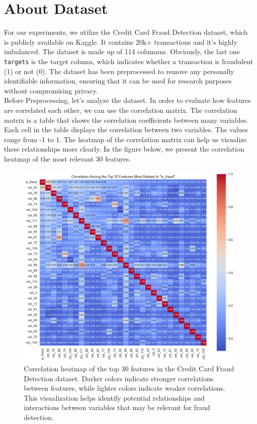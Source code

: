\documentclass[10pt]{article}
\begin{document}
\section{About Dataset}
For our experiments, we utilize the Credit Card Fraud Detection dataset, which is publicly available on Kaggle. It contains 20k+ transactions and it's highly imbalanced. The dataset is made up of 114 columuns. Obviously, the last one \texttt{targets} is the target column, which indicates whether a transaction is fraudulent (1) or not (0). The dataset has been preprocessed to remove any personally identifiable information, ensuring that it can be used for research purposes without compromising privacy.\\
Before Preprocessing, let's analyze the dataset. In order to evaluate how features are correlated each other, we can use the correlation matrix. The correlation matrix is a table that shows the correlation coefficients between many variables. Each cell in the table displays the correlation between two variables. The values range from -1 to 1. The heatmap of the correlation matrix can help us visualize these relationships more clearly. In the figure below, we present the correlation heatmap of the most relevant 30 features. 
\begin{figure}[H]
	\centering
	\includegraphics[height = 0.6\textheight]{img/correlation_heatmap_top_30_features.png}
	\caption{Correlation heatmap of the top 30 features in the Credit Card Fraud Detection dataset. Darker colors indicate stronger correlations between features, while lighter colors indicate weaker correlations. This visualization helps identify potential relationships and interactions between variables that may be relevant for fraud detection.}
\end{figure}
\end{document}
